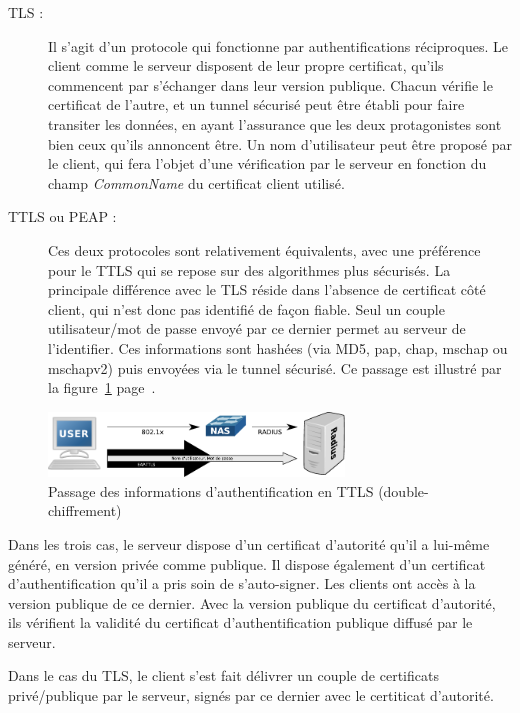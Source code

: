 \begin{description}
\item[TLS :] Il s'agit d'un protocole qui fonctionne par authentifications réciproques. Le client comme le serveur disposent de leur propre certificat, qu'ils commencent par s'échanger dans leur version publique. Chacun vérifie le certificat de l'autre, et un tunnel sécurisé peut être établi pour faire transiter les données, en ayant l'assurance que les deux protagonistes sont bien ceux qu'ils annoncent être. Un nom d'utilisateur peut être proposé par le client, qui fera l'objet d'une vérification par le serveur en fonction du champ \textit{CommonName} du certificat client utilisé.
\item[TTLS ou PEAP :] Ces deux protocoles sont relativement équivalents, avec une préférence pour le TTLS qui se repose sur des algorithmes plus sécurisés. La principale différence avec le TLS réside dans l'absence de certificat côté client, qui n'est donc pas identifié de façon fiable. Seul un couple utilisateur/mot de passe envoyé par ce dernier permet au serveur de l'identifier. Ces informations sont hashées (via MD5, pap, chap, mschap ou mschapv2) puis envoyées via le tunnel sécurisé. Ce passage est illustré par la figure~\ref{ttls} page~\pageref{ttls}.
\end{description}

\begin{figure}[!h]
	\begin{center}
		\includegraphics[width=0.7\textwidth]{img/ttls.pdf}
	\end{center}
	\caption{Passage des informations d'authentification en TTLS (double-chiffrement)}
	\label{ttls}
\end{figure}

Dans les trois cas, le serveur dispose d'un  certificat d'autorité qu'il a lui-même généré, en version privée comme publique. Il dispose également d'un certificat d'authentification qu'il a pris soin de s'auto-signer. Les clients ont accès à la version publique de ce dernier. Avec la version publique du certificat d'autorité, ils vérifient la validité du certificat d'authentification publique diffusé par le serveur.

Dans le cas du TLS, le client s'est fait délivrer un couple de certificats privé/publique par le serveur, signés par ce dernier avec le certiticat d'autorité.

